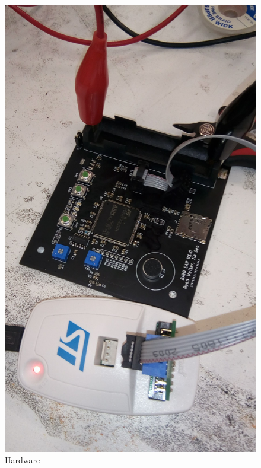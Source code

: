 \documentclass{article}
\begin{document}
\begin{figure}[H]
\centering
\includegraphics[scale=0.15]{../birdEar/img/be.jpg}
\caption{Hardware}
\label{hardware}
\end{figure}
\end{document}
